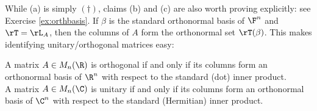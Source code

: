 While (a) is simply $(\dag)$, claims (b) and (c) are also worth proving explicitly: see Exercise \ref{ex:orthbasis}. If $\beta$ is the standard orthonormal basis of $\F^n$ and $\rT=\rL_A$, then the columns of $A$ form the orthonormal set $\rT(\beta)$. This makes identifying unitary/orthogonal matrices easy:


\begin{cor}{}{}
A matrix $A\in M_n(\R)$ is orthogonal if and only if its columns form an orthonormal basis of $\R^n$ with respect to the standard (dot) inner product.\\[5pt]
A matrix $A\in M_n(\C)$ is unitary if and only if its columns form an orthonormal basis of $\C^n$ with respect to the standard (Hermitian) inner product.
\end{cor}


\goodbreak

